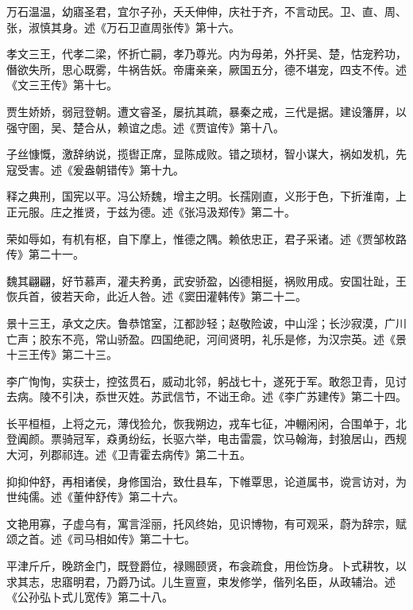 \documentclass[12pt,UTF8]{ctexbook}
\begin{document}
万石温温，幼寤圣君，宜尔子孙，夭夭伸伸，庆社于齐，不言动民。卫、直、周、张，淑慎其身。述《万石卫直周张传》第十六。



孝文三王，代孝二梁，怀折亡嗣，孝乃尊光。内为母弟，外扞吴、楚，怙宠矜功，僭欲失所，思心既雾，牛祸告妖。帝庸亲亲，厥国五分，德不堪宠，四支不传。述《文三王传》第十七。



贾生娇娇，弱冠登朝。遭文睿圣，屡抗其疏，暴秦之戒，三代是据。建设籓屏，以强守圉，吴、楚合从，赖谊之虑。述《贾谊传》第十八。



子丝慷慨，激辞纳说，揽辔正席，显陈成败。错之琐材，智小谋大，祸如发机，先寇受害。述《爰盎朝错传》第十九。



释之典刑，国宪以平。冯公矫魏，增主之明。长孺刚直，义形于色，下折淮南，上正元服。庄之推贤，于兹为德。述《张冯汲郑传》第二十。



荣如辱如，有机有枢，自下摩上，惟德之隅。赖依忠正，君子采诸。述《贾邹枚路传》第二十一。



魏其翩翩，好节慕声，灌夫矜勇，武安骄盈，凶德相挻，祸败用成。安国壮趾，王恢兵首，彼若天命，此近人咎。述《窦田灌韩传》第二十二。



景十三王，承文之庆。鲁恭馆室，江都訬轻；赵敬险诐，中山淫；长沙寂漠，广川亡声；胶东不亮，常山骄盈。四国绝祀，河间贤明，礼乐是修，为汉宗英。述《景十三王传》第二十三。



李广恂恂，实获士，控弦贯石，威动北邻，躬战七十，遂死于军。敢怨卫青，见讨去病。陵不引决，忝世灭姓。苏武信节，不诎王命。述《李广苏建传》第二十四。



长平桓桓，上将之元，薄伐猃允，恢我朔边，戎车七征，冲輣闲闲，合围单于，北登阗颜。票骑冠军，猋勇纷纭，长驱六举，电击雷震，饮马翰海，封狼居山，西规大河，列郡祁连。述《卫青霍去病传》第二十五。



抑抑仲舒，再相诸侯，身修国治，致仕县车，下帷覃思，论道属书，谠言访对，为世纯儒。述《董仲舒传》第二十六。



文艳用寡，子虚乌有，寓言淫丽，托风终始，见识博物，有可观采，蔚为辞宗，赋颂之首。述《司马相如传》第二十七。



平津斤斤，晚跻金门，既登爵位，禄赐颐贤，布衾疏食，用俭饬身。卜式耕牧，以求其志，忠寤明君，乃爵乃试。儿生亶亶，束发修学，偕列名臣，从政辅治。述《公孙弘卜式儿宽传》第二十八。
\end{document}
